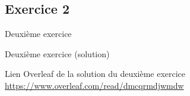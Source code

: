 \subsection{Exercice 2}

\begin{frame}[fragile]{Deuxième exercice}
  \begin{center}
  \end{center}
\end{frame}

\begin{frame}[fragile]{Deuxième exercice (solution)}
  \begin{center}
  Lien Overleaf de la solution du deuxième exercice \url{https://www.overleaf.com/read/dmcqrmdjwmdw}
  \end{center}
\end{frame}

